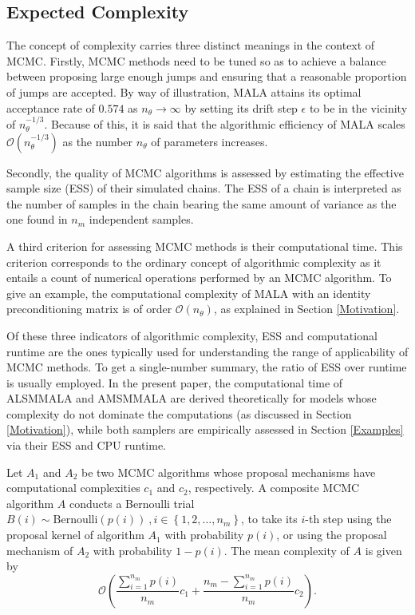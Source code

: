\documentclass[twoside,11pt]{article}
\begin{document}
\subsection{Expected Complexity}
\label{Expected Complexity}

The concept of complexity carries three distinct meanings in the context of MCMC. Firstly, MCMC methods need to be tuned so
as to achieve a balance between proposing large enough jumps and ensuring that a reasonable proportion of jumps are accepted.
By way of illustration, MALA attains its optimal acceptance rate of $0.574$ as $n_{\theta}\rightarrow\infty$ by setting its
drift step $\epsilon$ to be in the vicinity of $n_{\theta}^{-1/3}$. Because of this, it is said that the algorithmic
efficiency of MALA scales $\mathcal{O}(n_{\theta}^{-1/3})$ as the number $n_{\theta}$ of parameters increases.

Secondly, the quality of MCMC algorithms is assessed by estimating the effective sample size (ESS) of their simulated chains.
The ESS of a chain is interpreted as the number of samples in the chain bearing the same amount of variance as the one found 
in $n_m$ independent samples.

A third criterion for assessing MCMC methods is their computational time.
This criterion corresponds to the ordinary concept of algorithmic complexity as it entails a count of numerical operations
performed by an MCMC algorithm. To give an example, the computational complexity of MALA with an identity preconditioning
matrix is of order $\mathcal{O}(n_{\theta})$, as explained in Section \ref{Motivation}.

Of these three indicators of algorithmic complexity, ESS and computational runtime are the ones typically used for
understanding the range of applicability of MCMC methods. To get a single-number summary, the ratio of ESS over runtime is
usually employed. In the present paper, the computational time of ALSMMALA and AMSMMALA are derived theoretically for models
whose complexity do not dominate the computations (as discussed in Section \ref{Motivation}), while both samplers are 
empirically assessed in Section \ref{Examples} via their ESS and CPU runtime.

\begin{proposition}
Let $A_1$ and $A_2$ be two MCMC algorithms whose proposal mechanisms have computational complexities $c_1$ and $c_2$, 
respectively. A composite MCMC algorithm $A$ conducts a Bernoulli trial
$B(i)\sim\mbox{Bernoulli}(p(i))~,i\in\left\{1,2,\dots,n_m\right\}$, to take its $i$-th step using the proposal kernel of 
algorithm $A_1$ with probability $p(i)$, or using the proposal mechanism of $A_2$ with probability $1-p(i)$. The mean 
complexity of $A$ is given by
\begin{equation}
\label{eq:c}
\mathcal{O}\left(
\dfrac{\sum_{i=1}^{n_m}p(i)}{n_m}c_1+\dfrac{n_m-\sum_{i=1}^{n_m}p(i)}{n_m}c_2
\right).
\end{equation}
\end{proposition}
\end{document}
